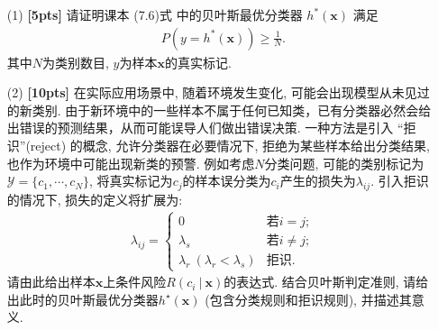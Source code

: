 \documentclass[a4paper,UTF8]{article}
\numberwithin{equation}{section}
\theoremstyle{definition}
\def \x {\boldsymbol{x}}
\newcommand\given[1][]{\:#1\vert\:}
\begin{document}
\begin{enumerate}
\item[(1)] \textbf{[5pts]} 请证明课本 (7.6)式 中的贝叶斯最优分类器 $h^*(\boldsymbol{x})$ 满足
\begin{align*}
    P(y = h^*(\boldsymbol{x})) \geq \frac{1}{N}.
\end{align*}
其中$N$为类别数目, $y$为样本$\x$的真实标记.

\item[(2)] \textbf{[10pts]} 在实际应用场景中, 随着环境发生变化, 可能会出现模型从未见过的新类别. 
由于新环境中的一些样本不属于任何已知类，已有分类器必然会给出错误的预测结果，从而可能误导人们做出错误决策. 
一种方法是引入 “拒识”(reject) 的概念, 允许分类器在必要情况下, 拒绝为某些样本给出分类结果, 也作为环境中可能出现新类的预警. 
例如考虑$N$分类问题, 可能的类别标记为$\mathcal{Y} = \{c_1, \cdots, c_N\}$, 将真实标记为$c_j$的样本误分类为$c_i$产生的损失为$\lambda_{ij}$. 
引入拒识的情况下, 损失的定义将扩展为:
\begin{align*}
    \lambda_{ij}= \begin{cases}
        0 & \text{若$i=j$}; \\
        \lambda_s & \text{若$i \neq j$}; \\
        \lambda_r \ (\lambda_r < \lambda_s)& \text{拒识}.
    \end{cases}
\end{align*}
请由此给出样本$\x$上条件风险$R(c_i \given \x)$的表达式. 结合贝叶斯判定准则, 请给出此时的贝叶斯最优分类器$h^\star(\x)$ (包含分类规则和拒识规则), 并描述其意义.
\end{enumerate}
\end{document}
